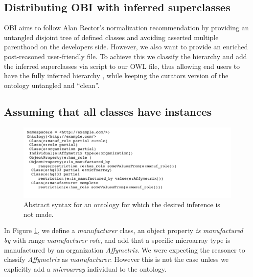 \documentclass{elsart}       %
\begin{document}
\subsection{Distributing OBI with inferred superclasses}

OBI aims to follow Alan Rector's\cite{rector} normalization recommendation by providing an untangled disjoint tree of defined classes and avoiding asserted multiple parenthood on the developers side. However, we also want to provide an enriched post-reasoned user-friendly file.
To achieve this we classify the hierarchy and add the inferred superclasses via script to our OWL file, thus allowing end users to have the fully inferred hierarchy %
, while keeping the curators version of the ontology untangled and ``clean''.

\subsection{Assuming that all classes have instances}

\begin{figure}[t]
\centering \includegraphics*[width=1\columnwidth]{instances}
\caption{Abstract syntax for an ontology for which the desired inference is not made.}
\label{fig:instances}
\end{figure}

In Figure \ref{fig:instances}, we define a \emph{manufacturer} class, an object property \emph{is manufactured by} with range \emph{manufacturer role}, and add that a specific microarray type is manufactured by an organization \emph{Affymetrix}.
We were expecting the reasoner to classify \emph{Affymetrix} as \emph{manufacturer}.
However this is not the case unless we explicitly add a \emph{microarray} individual to the ontology.
\end{document}
